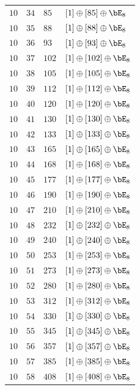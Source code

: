 \begin{center}
\begin{longtable}{llll}
 \(10\) & \(34\) & \(85\) & \([1] \oplus [85] \oplus \bE_{8}\) \\
 \(10\) & \(35\) & \(88\) & \([1] \oplus [88] \oplus \bE_{8}\) \\
 \(10\) & \(36\) & \(93\) & \([1] \oplus [93] \oplus \bE_{8}\) \\
 \(10\) & \(37\) & \(102\) & \([1] \oplus [102] \oplus \bE_{8}\) \\
 \(10\) & \(38\) & \(105\) & \([1] \oplus [105] \oplus \bE_{8}\) \\
 \(10\) & \(39\) & \(112\) & \([1] \oplus [112] \oplus \bE_{8}\) \\
 \(10\) & \(40\) & \(120\) & \([1] \oplus [120] \oplus \bE_{8}\) \\
 \(10\) & \(41\) & \(130\) & \([1] \oplus [130] \oplus \bE_{8}\) \\
 \(10\) & \(42\) & \(133\) & \([1] \oplus [133] \oplus \bE_{8}\) \\
 \(10\) & \(43\) & \(165\) & \([1] \oplus [165] \oplus \bE_{8}\) \\
 \(10\) & \(44\) & \(168\) & \([1] \oplus [168] \oplus \bE_{8}\) \\
 \(10\) & \(45\) & \(177\) & \([1] \oplus [177] \oplus \bE_{8}\) \\
 \(10\) & \(46\) & \(190\) & \([1] \oplus [190] \oplus \bE_{8}\) \\
 \(10\) & \(47\) & \(210\) & \([1] \oplus [210] \oplus \bE_{8}\) \\
 \(10\) & \(48\) & \(232\) & \([1] \oplus [232] \oplus \bE_{8}\) \\
 \(10\) & \(49\) & \(240\) & \([1] \oplus [240] \oplus \bE_{8}\) \\
 \(10\) & \(50\) & \(253\) & \([1] \oplus [253] \oplus \bE_{8}\) \\
 \(10\) & \(51\) & \(273\) & \([1] \oplus [273] \oplus \bE_{8}\) \\
 \(10\) & \(52\) & \(280\) & \([1] \oplus [280] \oplus \bE_{8}\) \\
 \(10\) & \(53\) & \(312\) & \([1] \oplus [312] \oplus \bE_{8}\) \\
 \(10\) & \(54\) & \(330\) & \([1] \oplus [330] \oplus \bE_{8}\) \\
 \(10\) & \(55\) & \(345\) & \([1] \oplus [345] \oplus \bE_{8}\) \\
 \(10\) & \(56\) & \(357\) & \([1] \oplus [357] \oplus \bE_{8}\) \\
 \(10\) & \(57\) & \(385\) & \([1] \oplus [385] \oplus \bE_{8}\) \\
 \(10\) & \(58\) & \(408\) & \([1] \oplus [408] \oplus \bE_{8}\) \\

\end{longtable}
\end{center}
